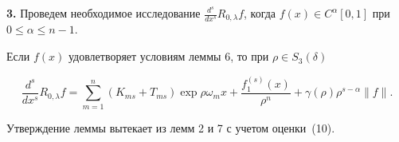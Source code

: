 {\bf 3.} Проведем необходимое исследование $ \frac {d^s}{dx^s}


R_{0,\lambda}f$, когда $f(x)\in C^\alpha[0,1]$ при $0\le\alpha


\le n-1$.





\begin{lem}


Если $f(x)$ удовлетворяет условиям леммы $6$, то при $\rho\in S_3


(\delta)$


$$


\frac {d^s}{dx^s}R_{0,\lambda} f=\sum\limits_{m=1}^n


(K_{ms}+T_{ms})\exp\rho\omega_mx+ \frac {f_1^{(s)}(x)}{\rho^n}+


\gamma(\rho)\rho^{s-\alpha}\|f\|.


$$


\end{lem}





Утверждение леммы вытекает из лемм 2 и 7 с учетом оценки~(10).





